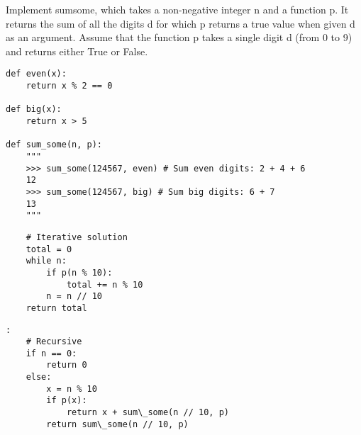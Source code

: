 \begin{blocksection}
\question Implement sumsome, which takes a non-negative integer n and a function p. It returns the sum of all the digits d for which p returns a true value when given d as an argument. Assume that the function p takes a single digit d (from 0 to 9) and returns either True or False. 

\begin{lstlisting}
def even(x):
    return x % 2 == 0
    
def big(x):
    return x > 5
    
def sum_some(n, p): 
    """
    >>> sum_some(124567, even) # Sum even digits: 2 + 4 + 6 
    12 
    >>> sum_some(124567, big) # Sum big digits: 6 + 7 
    13 
    """ 
\end{lstlisting}
\begin{solution}[1in]
\begin{lstlisting}
    # Iterative solution
    total = 0
    while n:
        if p(n % 10):
            total += n % 10
        n = n // 10
    return total
\end{lstlisting}
\end{solution}
\begin{solution}[1in]
\begin{lstlisting}:
    # Recursive
    if n == 0:
        return 0
    else:
        x = n % 10
        if p(x):
            return x + sum\_some(n // 10, p)
        return sum\_some(n // 10, p)
\end{lstlisting}
\end{solution}
\end{blocksection}
